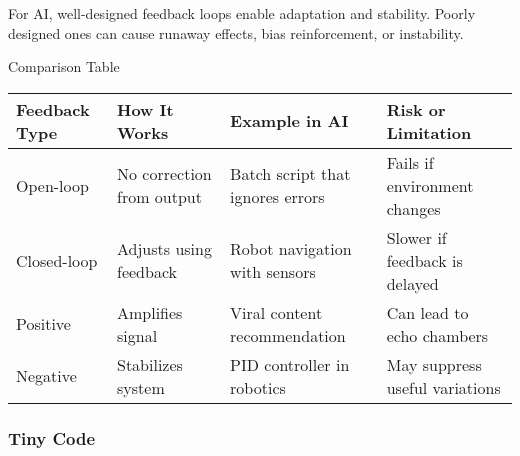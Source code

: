 \documentclass[
  letterpaper,
  DIV=11,
  numbers=noendperiod]{scrreprt}
\begin{document}
For AI, well-designed feedback loops enable adaptation and stability.
Poorly designed ones can cause runaway effects, bias reinforcement, or
instability.

Comparison Table

\begin{longtable}[]{@{}
  >{\raggedright\arraybackslash}p{}
  >{\raggedright\arraybackslash}p{}
  >{\raggedright\arraybackslash}p{}
  >{\raggedright\arraybackslash}p{}@{}}
\toprule\noalign{}
\begin{minipage}[b]{\linewidth}\raggedright
Feedback Type
\end{minipage} & \begin{minipage}[b]{\linewidth}\raggedright
How It Works
\end{minipage} & \begin{minipage}[b]{\linewidth}\raggedright
Example in AI
\end{minipage} & \begin{minipage}[b]{\linewidth}\raggedright
Risk or Limitation
\end{minipage} \\
\midrule\noalign{}
\endhead
\bottomrule\noalign{}
\endlastfoot
Open-loop & No correction from output & Batch script that ignores errors
& Fails if environment changes \\
Closed-loop & Adjusts using feedback & Robot navigation with sensors &
Slower if feedback is delayed \\
Positive & Amplifies signal & Viral content recommendation & Can lead to
echo chambers \\
Negative & Stabilizes system & PID controller in robotics & May suppress
useful variations \\
\end{longtable}

\subsubsection{Tiny Code}\label{tiny-code-3}
\end{document}
